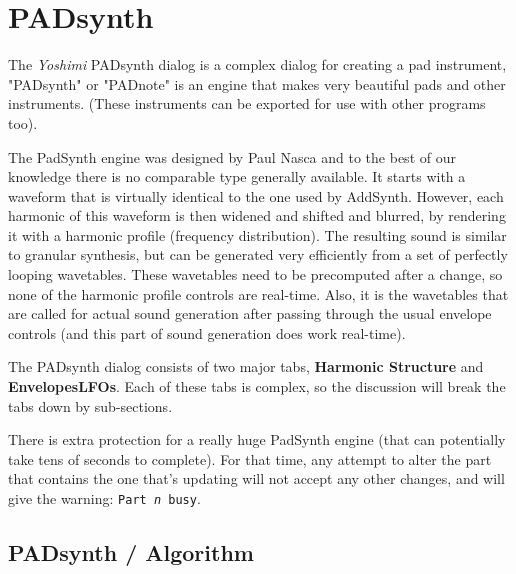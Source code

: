 %
%
%

\section{PADsynth}
\label{sec:padsynth}

   The \textsl{Yoshimi} PADsynth dialog is a complex dialog for creating a
   pad instrument,  "PADsynth" or "PADnote" is an engine that makes very
   beautiful pads and other instruments. (These instruments can be exported
   for use with other programs too).

   The PadSynth engine was designed by Paul Nasca and to the best of our
   knowledge there is no comparable type generally available. It starts with a
   waveform that is virtually identical to the one used by AddSynth. However,
   each harmonic of this waveform is then widened and shifted and blurred, by
   rendering it with a harmonic profile (frequency distribution). The resulting
   sound is similar to granular synthesis, but can be generated very
   efficiently from a set of perfectly looping wavetables. These wavetables
   need to be precomputed after a change, so none of the harmonic profile
   controls are real-time. Also, it is the wavetables that are called for
   actual sound generation after passing through the usual envelope controls
   (and this part of sound generation does work real-time).

   The PADsynth dialog consists of two major tabs,
   \textbf{Harmonic Structure} and \textbf{EnvelopesLFOs}.
   Each of these tabs is complex, so the discussion
   will break the tabs down by sub-sections.

   There is extra protection for a really huge PadSynth engine
   (that can potentially take tens of seconds to complete).
   For that time, any attempt to alter the part that contains the one
   that's updating will not accept any other changes,
   and will give the warning: \texttt{Part \textsl{n} busy}.

\subsection{PADsynth / Algorithm}
\label{subsec:padsynth_algorithm}

